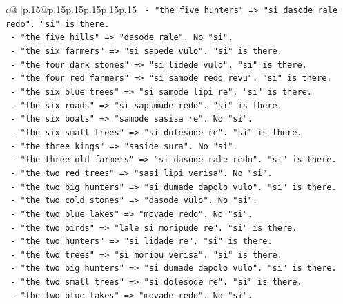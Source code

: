 \documentclass{article}
\begin{document}
{\begin{supertabular}{c@{$\;$}|p{.15\linewidth}@{}p{.15\linewidth}p{.15\linewidth}p{.15\linewidth}p{.15\linewidth}p{.15\linewidth}}
{{{\texttt{                 {-} "the five hunters" => "si dasode rale redo". "si" is there.} \\
\texttt{                 {-} "the five hills" => "dasode rale". No "si".} \\
\texttt{                 {-} "the six farmers" => "si sapede vulo". "si" is there.} \\
\texttt{                 {-} "the four dark stones" => "si lidede vulo". "si" is there.} \\
\texttt{                 {-} "the four red farmers" => "si samode redo revu". "si" is there.} \\
\texttt{                 {-} "the six blue trees" => "si samode lipi re". "si" is there.} \\
\texttt{                 {-} "the six roads" => "si sapumude redo". "si" is there.} \\
\texttt{                 {-} "the six boats" => "samode sasisa re". No "si".} \\
\texttt{                 {-} "the six small trees" => "si dolesode re". "si" is there.} \\
\texttt{                 {-} "the three kings" => "saside sura". No "si".} \\
\texttt{                 {-} "the three old farmers" => "si dasode rale redo". "si" is there.} \\
\texttt{                 {-} "the two red trees" => "sasi lipi verisa". No "si".} \\
\texttt{                 {-} "the two big hunters" => "si dumade dapolo vulo". "si" is there.} \\
\texttt{                 {-} "the two cold stones" => "dasode vulo". No "si".} \\
\texttt{                 {-} "the two blue lakes" => "movade redo". No "si".} \\
\texttt{                 {-} "the two birds" => "lale si moripude re". "si" is there.} \\
\texttt{                 {-} "the two hunters" => "si lidade re". "si" is there.} \\
\texttt{                 {-} "the two trees" => "si moripu verisa". "si" is there.} \\
\texttt{                 {-} "the two big hunters" => "si dumade dapolo vulo". "si" is there.} \\
\texttt{                 {-} "the two small trees" => "si dolesode re". "si" is there.} \\
\texttt{                 {-} "the two blue lakes" => "movade redo". No "si".} \\
}}}
\end{supertabular}}
\end{document}
